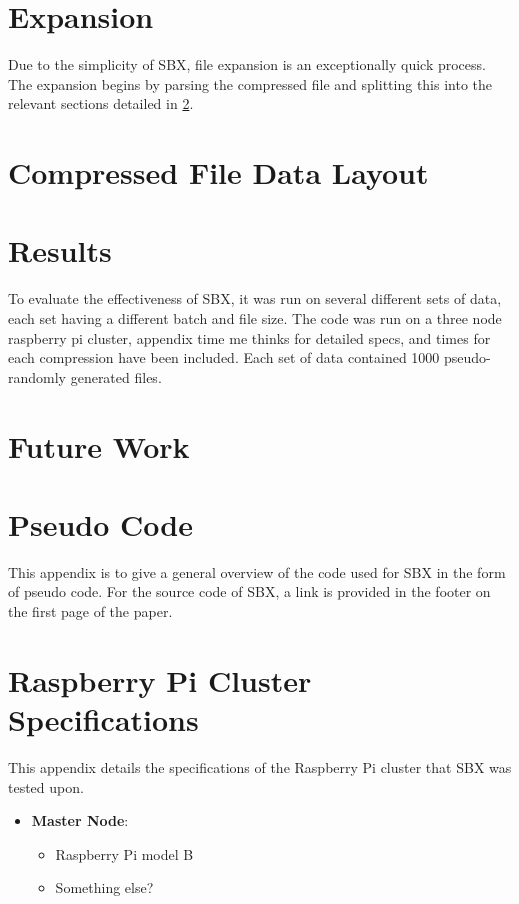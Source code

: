 \documentclass{hehe}
\begin{document}
\section{Expansion}

Due to the simplicity of SBX, file expansion is an exceptionally quick process. The expansion begins by parsing the compressed file and splitting this into the relevant sections detailed in \cref{CompressedLayout}.

\section{Compressed File Data Layout}
\label{CompressedLayout}


\section{Results}

To evaluate the effectiveness of SBX, it was run on several different sets of data, each set having a different batch and file size. The code was run on a three node raspberry pi cluster, appendix time me thinks for detailed specs, and times for each compression have been included. Each set of data contained 1000 pseudo-randomly generated files.

\section{Future Work}



\appendix
\section{Pseudo Code}
This appendix is to give a general overview of the code used for SBX in the form of pseudo code. For the source code of SBX, a link is provided in the footer on the first page of the paper.


\section{Raspberry Pi Cluster Specifications}
This appendix details the specifications of the Raspberry Pi cluster that SBX was tested upon.

\begin{itemize}
  \item \textbf{Master Node}:\\
  \begin{itemize}
    \item Raspberry Pi model B
    \item Something else?
  \end{itemize}
\end{itemize}
\end{document}

